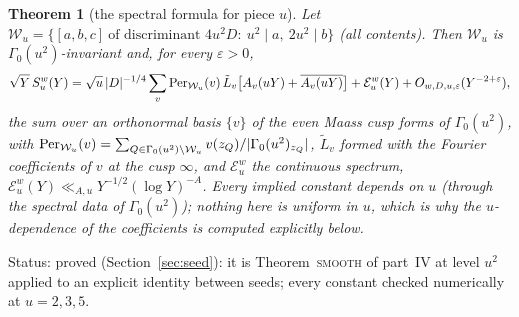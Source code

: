 \documentclass[11pt,a4paper]{article}
\newtheorem{theorem}{Theorem}
\theoremstyle{remark}\newtheorem{remark}[theorem]{Remark}
\newcommand{\status}[1]{\textcolor{blue!50!black}{\small\sffamily Status: #1}}
\begin{document}
\begin{theorem}[the spectral formula for piece $u$]\label{thm:pieceu}
Let $\mathcal W_u=\{[a,b,c]\ \text{of discriminant }4u^2D:\ u^2\mid a,\ 2u^2\mid b\}$ (all contents). Then $\mathcal W_u$ is
$\Gamma_0(u^2)$-invariant and, for every $\varepsilon>0$,
\[
\sqrt Y\,S^w_u(Y)=\sqrt u\,|D|^{-1/4}\sum_v\mathrm{Per}_{\mathcal W_u}(v)\,\tilde L_v\bigl[A_v(uY)+\overline{A_v(uY)}\bigr]+\mathcal E^w_u(Y)+O_{w,D,u,\varepsilon}(Y^{-2+\varepsilon}),
\]
the sum over an orthonormal basis $\{v\}$ of the even Maass cusp forms of $\Gamma_0(u^2)$, with $\mathrm{Per}_{\mathcal W_u}(v)=
\sum_{Q\in\Gamma_0(u^2)\backslash\mathcal W_u}v(z_Q)/|\Gamma_0(u^2)_{z_Q}|$, $\tilde L_v$ formed with the Fourier coefficients
of $v$ at the cusp $\infty$, and $\mathcal E^w_u$ the continuous spectrum, $\mathcal E^w_u(Y)\ll_{A,u}Y^{-1/2}(\log Y)^{-A}$. Every
implied constant depends on $u$ (through the spectral data of $\Gamma_0(u^2)$); nothing here is uniform in $u$, which is why the
$u$-dependence of the coefficients is computed explicitly below.
\end{theorem}
\status{proved (Section~\ref{sec:seed}): it is Theorem~\textsc{smooth} of part~IV at level $u^2$ applied to an explicit
identity between seeds; every constant checked numerically at $u=2,3,5$.}
\end{document}
